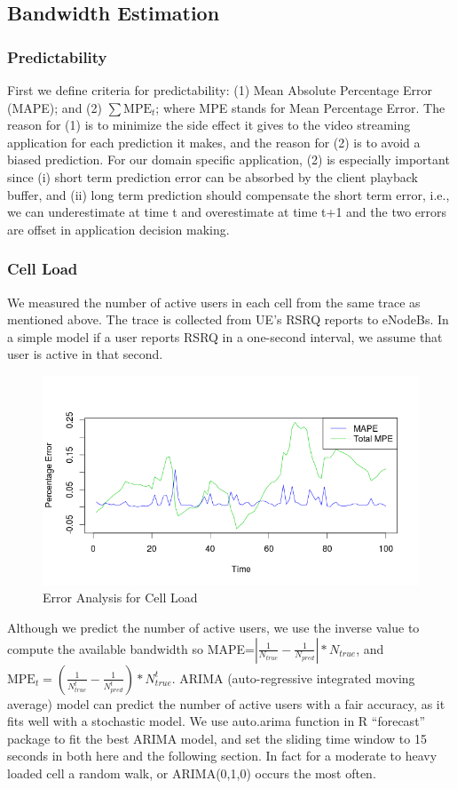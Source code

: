 \subsection{Bandwidth Estimation} \label{subsec:Prediction}


\subsubsection{Predictability}
First we define criteria for predictability: (1) Mean Absolute Percentage Error (MAPE); and (2) $\sum\text{MPE}_t$; where MPE stands for Mean Percentage Error. The reason for (1) is to minimize the side effect it gives to the video streaming application for each prediction it makes, and the reason for (2) is to avoid a biased prediction. For our domain specific application, (2) is especially important since (i) short term prediction error can be absorbed by the client playback buffer, and (ii) long term prediction should compensate the short term error, i.e., we can underestimate at time t and overestimate at time t+1 and the two errors are offset in application decision making. 


\subsubsection{Cell Load}\label{subsec:NUser}
We measured the number of active users in each cell from the same trace as mentioned above. The trace is collected from UE's RSRQ reports to eNodeBs. In a simple model if a user reports RSRQ in a one-second interval, we assume that user is active in that second. 

\begin{figure}[t]
\centering
 \includegraphics[width=0.8\linewidth]{pictures/MPE.png}
\caption{Error Analysis for Cell Load} \label{fig:NAIVEMPE}
\end{figure}

Although we predict the number of active users, we use the inverse value to compute the available bandwidth so MAPE=$ |\frac{1}{N_{true}} - \frac{1}{N_{pred}}| *N_{true}$, and $\text{MPE}_t=(\frac{1}{N^t_{true}} - \frac{1}{N^t_{pred}})*N^t_{true}$. ARIMA (auto-regressive integrated moving average) model can predict the number of active users with a fair accuracy, as it fits well with a stochastic model. We use auto.arima function in R ``forecast'' package to fit the best ARIMA model, and set the sliding time window to 15 seconds in both here and the following section. In fact for a moderate to heavy loaded cell a random walk, or ARIMA(0,1,0) occurs the most often. 

